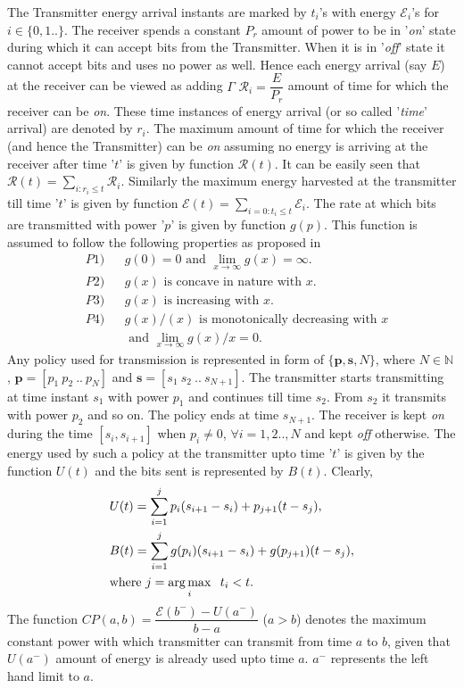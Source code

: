 The Transmitter energy arrival instants are marked by $t_i$'s with energy $\mathcal{E}_i$'s for $i \in \{0,1..\}$. The receiver spends a constant $P_{r}$ amount of power to be in '\textit{on}' state during which it can accept bits from the Transmitter. When it is in '\textit{off}' state it cannot accept bits and uses no power as well. Hence each energy arrival (say $E$) at the receiver can be viewed as adding $ \Gamma $ $\mathcal{R}_i=\dfrac{E}{P_{r}}$ amount of time for which the receiver can be \textit{on}. These time instances of energy arrival (or so called '\textit{time}' arrival) are denoted by $r_i$. The maximum amount of time for which the receiver (and hence the Transmitter) can be \textit{on} assuming no energy is arriving at the receiver after time '$t$' is given by function $\mathcal{R}(t)$. It can be easily seen that $\mathcal{R}(t)=\underset{i:r_i\le t}{\sum}\mathcal{R}_i$. Similarly the maximum energy harvested at the transmitter till time '$t$' is given by function $\mathcal{E}(t)=\underset{i=0:t_i\le t}{\sum}\mathcal{E}_i$. The rate at which bits are transmitted with power '$p$' is given by function $g(p)$. This function is assumed to follow the following properties as proposed in \cite{Yang} 
\begin{align}
&P1) &&g(0)=0\text{ and }\lim_{x\rightarrow \infty} g(x)= \infty.\label{property_0_infty}
\\
&P2) &&g(x)\text{ is concave in nature with } x.\label{property_concave}
\\
&P3) &&g(x)\text{ is increasing with } x.\label{property_increasing}
\\ 
&P4) &&g(x)/(x) \text{ is monotonically decreasing with } x\nonumber
\\
&    &&\text{ and } \lim_{x\rightarrow \infty} g(x)/x= 0.\label{property_decreasing}
\end{align}
Any policy used for transmission is represented in form of $\{\textbf{p},\textbf{s},N\}$, where $N\in \mathbb{N}$, $\textbf{p}=[p_1\ p_2\ ..\ p_N]$ and $\textbf{s}=[s_1\ s_2\ ..\ s_{N+1}]$. The transmitter starts transmitting at time instant $s_1$ with power $p_1$ and continues till time $s_2$. From $s_2$ it transmits with power $p_2$ and so on. The policy ends at time $s_{N+1}$. The receiver is kept \textit{on} during the time $[s_i,s_{i+1}]$ when $p_i\ne 0$, $\forall i=1,2..,N$ and kept \textit{off} otherwise. The energy used by such a policy at the transmitter upto time '$t$' is given by the function $U(t)$ and the bits sent is represented by $B(t)$. Clearly,
\begin{align}
&U(t)=\sum_{i=1}^{j} p_i(s_{i+1}-s_i)+p_{j+1}(t-s_j) ,
\\
&B(t)=\sum_{i=1}^{j} g(p_i)(s_{i+1}-s_i)+g(p_{j+1})(t-s_j),
\\
&\text{where }j=\operatorname*{arg\,max}_{i} \hspace{2mm}t_i<t.\nonumber
\end{align}
The function $CP(a,b)=\dfrac{\mathcal{E}(b^- )-U(a^- )}{b-a}$ ($a>b$) denotes the maximum constant power with which transmitter can transmit from time $a$ to $b$, given that $U(a^- )$ amount of energy is already used upto time $a$. $a^-$ represents the left hand limit to $a$.


